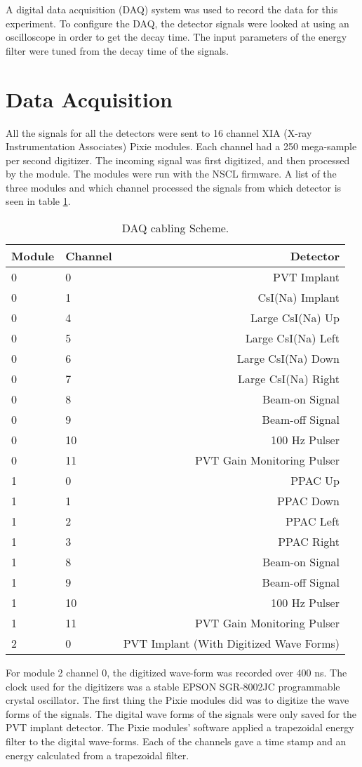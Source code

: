 \documentclass[../MaxHughesThesis.tex]{subfiles}
\begin{document}
A digital data acquisition (DAQ) system was used to record the data for this experiment.
To configure the DAQ, the detector signals were looked at using an oscilloscope in order to get the decay time.
The input parameters of the energy filter were tuned from the decay time of the signals.

\section{Data Acquisition}

All the signals for all the detectors were sent to 16 channel XIA (X-ray Instrumentation Associates) Pixie modules. 
Each channel had a 250 mega-sample per second digitizer. 
The incoming signal was first digitized, and then processed by the module. 
The modules were run with the NSCL firmware.
A list of the three modules and which channel processed the signals from which detector is seen in table \ref{tab:cablingscheme}.
%
\begin{table}[!hbt]
	\centering
	\caption{DAQ cabling Scheme.}
		\begin{tabular}{llr}
		Module & Channel & Detector \\ \hline
		0 & 0 & PVT Implant \\
		0 & 1 & CsI(Na) Implant \\
		0 & 4 & Large CsI(Na) Up \\
		0 & 5 & Large CsI(Na) Left \\
		0 & 6 & Large CsI(Na) Down \\
		0 & 7 & Large CsI(Na) Right \\
		0 & 8 & Beam-on Signal \\
		0 & 9 & Beam-off Signal \\
		0 & 10 & 100 Hz Pulser \\
		0 & 11 & PVT Gain Monitoring Pulser \\
		1 & 0 & PPAC Up \\ 
		1 & 1 & PPAC Down \\ 
		1 & 2 & PPAC Left \\ 
		1 & 3 & PPAC Right \\ 
		1 & 8 & Beam-on Signal\\
		1 & 9 & Beam-off Signal\\
		1 & 10 & 100 Hz Pulser \\
		1 & 11 & PVT Gain Monitoring Pulser \\
		2 & 0 & PVT Implant (With Digitized Wave Forms)
		\end{tabular}	
		\label{tab:cablingscheme}
\end{table}
%
For module 2 channel 0, the digitized wave-form was recorded over 400 ns.
The clock used for the digitizers was a stable EPSON SGR-8002JC programmable crystal oscillator.
The first thing the Pixie modules did was to digitize the wave forms of the signals.
The digital wave forms of the signals were only saved for the PVT implant detector.
The Pixie modules' software applied a trapezoidal energy filter to the digital wave-forms.
Each of the channels gave a time stamp and an energy calculated from a trapezoidal filter.
\end{document}
